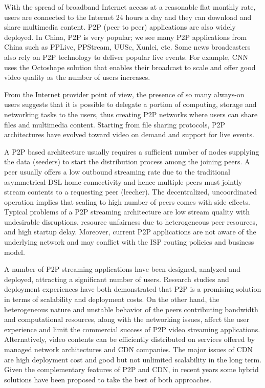 \documentclass[paper]{ieice}
\begin{document}
With the spread of broadband Internet access at a reasonable flat
monthly rate, users are connected to the Internet 24 hours a day and
they can download and share multimedia content.  P2P (peer to peer)
applications are also widely deployed.  In China, P2P is very popular;
we see many P2P applications from China such as PPLive, PPStream,
UUSe, Xunlei, etc.  Some news broadcasters also rely on P2P technology
to deliver popular live events.  For example, CNN uses the Octoshape
solution that enables their broadcast to scale and offer good video
quality as the number of users increases.

From the Internet provider point of view, the presence of so many
always-on users suggests that it is possible to delegate a portion of
computing, storage and networking tasks to the users, thus creating
P2P networks where users can share files and multimedia content.
Starting from file sharing protocols, P2P architectures have evolved
toward video on demand and support for live events.

A P2P based architecture usually requires a sufficient number of nodes
supplying the data (seeders) to start the distribution process among
the joining peers.  A peer usually offers a low outbound streaming
rate due to the traditional asymmetrical DSL home connectivity and
hence multiple peers must jointly stream contents to a requesting peer
(leecher).  The decentralized, uncoordinated operation implies that
scaling to high number of peers comes with side effects.  Typical
problems of a P2P streaming architecture are low stream quality with
undesirable disruptions, resource unfairness due to heterogeneous peer
resources, and high startup delay.  Moreover, current P2P applications
are not aware of the underlying network and may conflict with the ISP
routing policies and business model.

A number of P2P streaming applications have been designed, analyzed
and deployed, attracting a significant number of users.  Research
studies and deployment experiences have both demonstrated that P2P is
a promising solution in terms of scalability and deployment costs.  On
the other hand, the heterogeneous nature and unstable behavior of the
peers contributing bandwidth and computational resources, along with
the networking issues, affect the user experience and limit the
commercial success of P2P video streaming applications.
Alternatively, video contents can be efficiently distributed on
services offered by managed network architectures and CDN companies.
The major issues of CDN are high deployment cost and good but not
unlimited scalability in the long term.  Given the complementary
features of P2P and CDN, in recent years some hybrid solutions have
been proposed \cite{Huang:2008:UHC:1496046.1496064,4772628,Yin:2009:DDH:1631272.1631279}
to take the best of both approaches.
\end{document}
